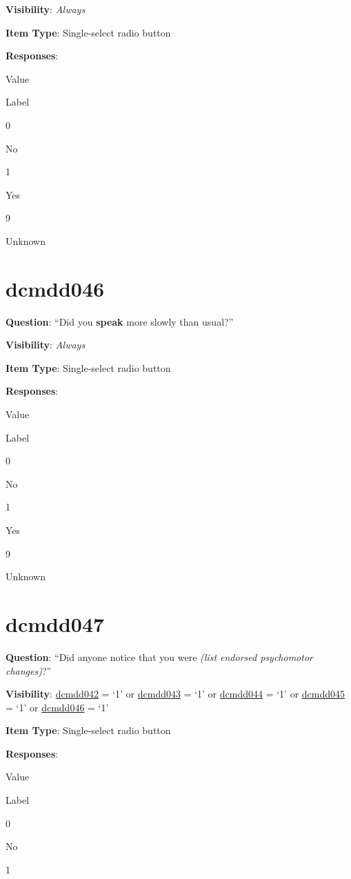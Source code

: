 \documentclass[]{book}
\begin{document}
\textbf{Visibility}: \emph{Always}

\textbf{Item Type}: Single-select radio button

\textbf{Responses}:

Value

Label

0

No

1

Yes

9

Unknown

\hypertarget{dcmdd046}{%
\section{dcmdd046}\label{dcmdd046}}

\textbf{Question}: ``Did you \textbf{speak} more slowly than usual?''

\textbf{Visibility}: \emph{Always}

\textbf{Item Type}: Single-select radio button

\textbf{Responses}:

Value

Label

0

No

1

Yes

9

Unknown

\hypertarget{dcmdd047}{%
\section{dcmdd047}\label{dcmdd047}}

\textbf{Question}: ``Did anyone notice that you were \emph{(list endorsed psychomotor changes)}?''

\textbf{Visibility}: \protect\hyperlink{dcmdd042}{dcmdd042} = `1' or \protect\hyperlink{dcmdd043}{dcmdd043} = `1' or \protect\hyperlink{dcmdd044}{dcmdd044} = `1' or \protect\hyperlink{dcmdd045}{dcmdd045} = `1' or \protect\hyperlink{dcmdd046}{dcmdd046} = `1'

\textbf{Item Type}: Single-select radio button

\textbf{Responses}:

Value

Label

0

No

1
\end{document}
